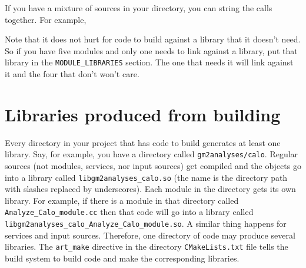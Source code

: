   If you have a mixture of sources in your directory, you can string
  the calls together. For example,


 

Note that it does not hurt for code to build against a library that it
doesn't need. So if you have five modules and only one needs to link
against a library, put that library in the \texttt{MODULE\_LIBRARIES}
section. The one that needs it will link against it and the four that
don't won't care.

\section{Libraries produced from building}
\label{sec:libr-building}

Every directory in your project that has code to build generates at
least one library. Say, for example, you have a directory
called \texttt{gm2analyses/calo}. Regular sources (not modules,
services, nor input sources) get compiled and the objects go into a
library called \texttt{libgm2analyses\_calo.so} (the name is the
directory path with slashes replaced by underscores). Each module in
the directory gets its own library. For example, if there is a module
in that directory called \texttt{Analyze\_Calo\_module.cc} then that
code will go into a library called
\texttt{libgm2analyses\_calo\_Analyze\_Calo\_module.so}. A similar
thing happens for services and input sources. Therefore, one directory
of code may produce several libraries. The \texttt{art\_make}
directive in the directory \texttt{CMakeLists.txt} file tells the
build system to build code and make the corresponding libraries.



